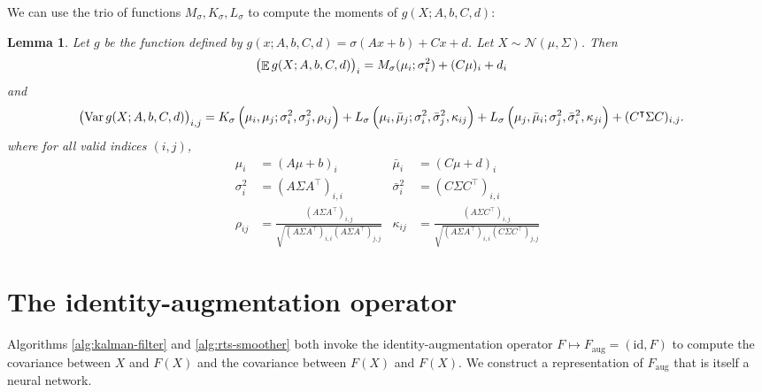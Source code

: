 \documentclass[oneside, article]{memoir}
\newtheorem{lemma}{Lemma}
\DeclareMathOperator{\expect}{\mathbb{E}}
\DeclareMathOperator{\Var}{\operatorname{Var}}
\begin{document}
We can use the trio of functions \(M_\sigma, K_\sigma, L_\sigma\) to
compute the moments of \(g(X; A, b, C, d)\):
\begin{lemma}
  Let \(g\) be the function defined by \(g(x; A, b, C, d) = \sigma(A
  x+ b) + C x + d\).
  Let \(X \sim \mathcal N(\mu, \Sigma)\).
  Then
  \begin{align*}
    \del{\expect g(X; A, b, C, d)}_i &= M_\sigma(\mu_i; \sigma_i^2) +
    (C\mu)_i + d_i
  \end{align*}
  and
  \begin{align*}
    \del{\Var g(X; A, b, C, d)}_{i, j}
    &= K_\sigma\del{
      \mu_i, \mu_j; \sigma_i^2, \sigma_j^2, \rho_{ij}
    }
    + L_\sigma\del{
      \mu_i, \bar \mu_j; \sigma_i^2, \bar \sigma_j^2, \kappa_{ij}
    }
    + L_\sigma\del{
      \mu_j, \bar \mu_i; \sigma_j^2, \bar \sigma_i^2, \kappa_{ji}
    }
    + (C^\intercal \Sigma C)_{i, j}.
  \end{align*}
  where for all valid indices \((i, j)\),
  \begin{align*}
    \mu_i &= (A\mu + b)_i
    &
    \bar \mu_i &= (C\mu + d)_i
    \\
    \sigma_i^2 &= (A\Sigma A^\intercal)_{i,i}
    &
    \bar \sigma_i^2
    &= (C\Sigma C^\intercal)_{i,i}
    \\
    \rho_{ij} &= \frac{(A\Sigma A^\intercal)_{i,j}}{\sqrt{(A\Sigma
    A^\intercal)_{i,i} (A\Sigma A^\intercal)_{j,j}}}
    &
    \kappa_{ij}
    &= \frac{
      (A \Sigma C^\intercal)_{i,j}
    }{
      \sqrt{
        (A\Sigma A^\intercal)_{i,i} (C\Sigma C^\intercal)_{j,j}
      }
    }
  \end{align*}
\end{lemma}

\section{The identity-augmentation operator}
Algorithms \ref{alg:kalman-filter} and \ref{alg:rts-smoother}
both invoke the identity-augmentation operator \(F \mapsto F_\text{aug}=(\text{id}, F)\) to compute the covariance between \(X\) and \(F(X)\) and the covariance between \(F(X)\) and \(F(X)\).
We construct a representation of \(F_\text{aug}\) that is itself a neural network.
\end{document}
